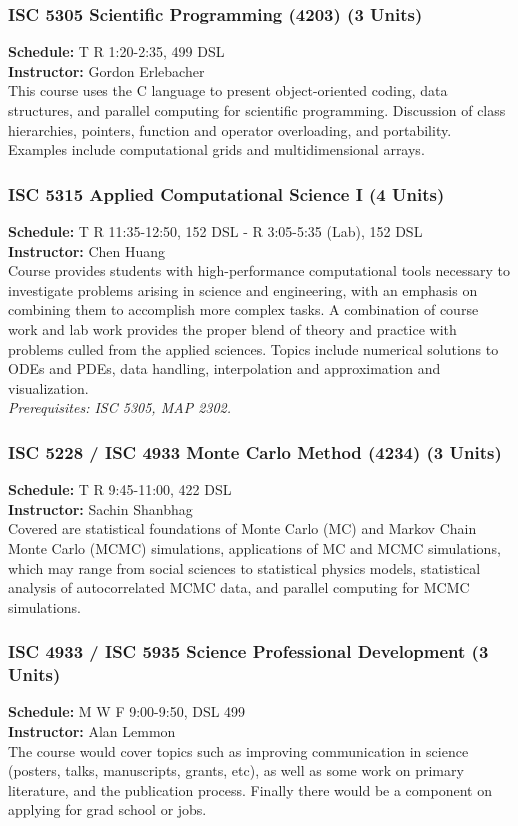 \documentclass[12pt,a4paper]{article}
\begin{document}
\subsubsection*{ISC 5305 Scientific Programming (4203) (3 Units)}
\textbf{Schedule:} T R 1:20-2:35, 499 DSL \\
\textbf{Instructor:} Gordon Erlebacher \\
This course uses the C language to present object-oriented coding, data structures, and parallel computing for scientific programming. Discussion of class hierarchies, pointers, function and operator overloading, and portability. Examples include computational grids and multidimensional arrays.

\subsubsection*{ISC 5315 Applied Computational Science I (4 Units)}
\textbf{Schedule:} T R 11:35-12:50, 152 DSL - R 3:05-5:35 (Lab), 152 DSL \\
\textbf{Instructor:} Chen Huang \\
Course provides students with high-performance computational tools necessary to investigate problems arising in science and engineering, with an emphasis on combining them to accomplish more complex tasks. A combination of course work and lab work provides the proper blend of theory and practice with problems culled from the applied sciences. Topics include numerical solutions to ODEs and PDEs, data handling, interpolation and approximation and visualization. \\
\textit{Prerequisites: ISC 5305, MAP 2302.}

\subsubsection*{ISC 5228 / ISC 4933 Monte Carlo Method (4234) (3 Units)}
\textbf{Schedule:} T R 9:45-11:00, 422 DSL \\
\textbf{Instructor:} Sachin Shanbhag \\
Covered are statistical foundations of Monte Carlo (MC) and Markov Chain Monte Carlo (MCMC) simulations, applications of MC and MCMC simulations, which may range from social sciences to statistical physics models, statistical analysis of autocorrelated MCMC data, and parallel computing for MCMC simulations.

\subsubsection*{ISC 4933 / ISC 5935 Science Professional Development (3 Units)}
\textbf{Schedule:} M W F 9:00-9:50, DSL 499 \\
\textbf{Instructor:} Alan Lemmon \\
The course would cover topics such as improving communication in science (posters, talks, manuscripts, grants, etc), as well as some work on primary literature, and the publication process. Finally there would be a component on applying for grad school or jobs.
\end{document}

